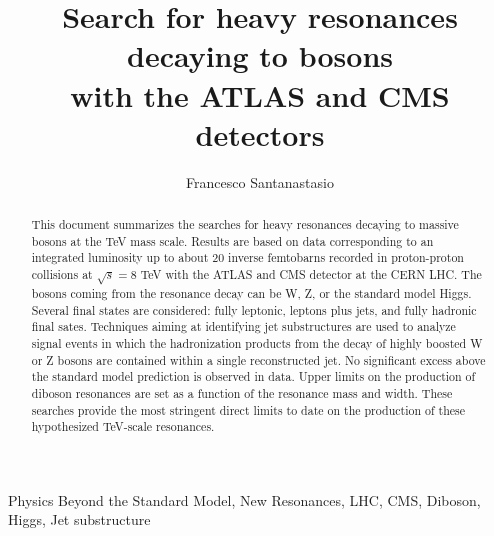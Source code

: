 \documentclass[3p,times,twocolumn]{elsarticle}
\begin{document}
\begin{frontmatter}



\dochead{}

\title{Search for heavy resonances decaying to bosons\\ with the ATLAS and CMS detectors}


\author{Francesco Santanastasio}

\address{Sapienza, University of Rome}

\begin{abstract}
This document summarizes the searches for heavy resonances decaying to
massive bosons at the TeV mass scale. Results are based on data corresponding to an integrated luminosity
up to about 20 inverse femtobarns recorded in proton-proton collisions at
$\sqrt{s} = 8$ TeV with the ATLAS and CMS detector at the CERN LHC. 
The bosons coming from the resonance decay can be W, Z, 
or the standard model Higgs. Several final states are
considered: fully leptonic, leptons plus jets, 
and fully hadronic final sates. Techniques aiming at identifying jet
substructures are used to analyze signal events in which the
hadronization products from the decay of highly boosted W or Z 
bosons are contained within a single reconstructed jet. 
No significant excess above the standard model prediction is observed
in data. Upper limits on the production of diboson resonances are 
set as a function of the resonance mass and width. 
These searches provide the most stringent direct limits to date on the production of these
hypothesized TeV-scale resonances. 
\end{abstract}

\begin{keyword}
Physics Beyond the Standard Model, New Resonances, LHC, CMS, Diboson, Higgs, Jet substructure
\end{keyword}

\end{frontmatter}
\end{document}

